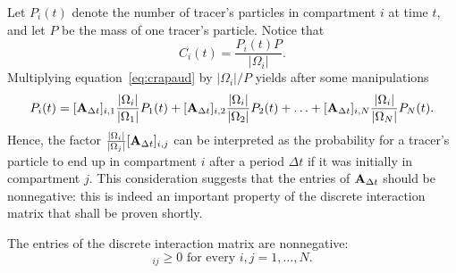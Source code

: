 Let $P_i(t)$ denote the number of tracer's particles in compartment $i$ at time $t$, and let $P$ be the mass of one tracer's particle. Notice that
\begin{equation}
	C_i(t) = \frac{P_i(t) P}{|\Omega_i|}.
\end{equation}
Multiplying equation~\eqref{eq:crapaud} by $|\Omega_i|/P$ yields after some manipulations
\begin{equation}
	P_i(t) = [\mathbf A_{\Delta t}]_{i,1} \frac{|\Omega_i|}{|\Omega_1|} P_{1}(t) + [\mathbf A_{\Delta t}]_{i,2}\frac{|\Omega_i|}{|\Omega_2|} P_{2}(t) + \ldots + [\mathbf A_{\Delta t}]_{i,N}\frac{|\Omega_i|}{|\Omega_N|} P_{N}(t).
\end{equation}
Hence, the factor $\frac{|\Omega_i|}{|\Omega_j|}[\mathbf A_{\Delta t}]_{i,j}$ can be interpreted as the probability \label{page:probability_interpretation} for a tracer's particle to end up in compartment $i$ after a period $\Delta t$ if it was initially in compartment $j$. This consideration suggests that the entries of $\mathbf A_{\Delta t}$ should be nonnegative: this is indeed an important property of the discrete interaction matrix that shall be proven shortly.
\begin{property} \label{prop1_discr_comp}
	The entries of the discrete interaction matrix are nonnegative:
	\begin{equation}
		[\b A_{\Delta t}]_{ij} \ge 0 \mbox{ for every } i,j = 1,\dots,N.
	\end{equation}
\end{property}
